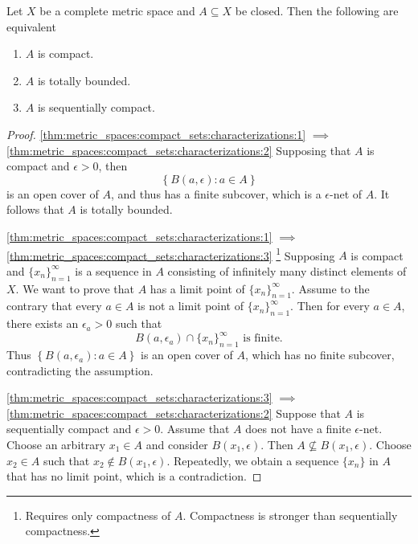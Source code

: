 \begin{thm}
\label{thm:metric_spaces:compact_sets:characterizations}
Let $X$ be a complete metric space and $A \subseteq X$ be closed. 
Then the following are equivalent 
\begin{enumerate}
    \item \label{thm:metric_spaces:compact_sets:characterizations:1}
    $A$ is compact. 
    \item \label{thm:metric_spaces:compact_sets:characterizations:2}
    $A$ is totally bounded. 
    \item \label{thm:metric_spaces:compact_sets:characterizations:3}
    $A$ is sequentially compact. 
\end{enumerate}
\end{thm}
\begin{proof}
\ref{thm:metric_spaces:compact_sets:characterizations:1} $\implies$ 
\ref{thm:metric_spaces:compact_sets:characterizations:2}
Supposing that $A$ is compact and $\epsilon > 0$, then 
\begin{equation*}
    \left\{ B(a, \epsilon): a \in A\right\}
\end{equation*}
is an open cover of $A$, and thus has a finite subcover, which is a 
$\epsilon$-net of $A$. 
It follows that $A$ is totally bounded. 

\ref{thm:metric_spaces:compact_sets:characterizations:1} $\implies$
\ref{thm:metric_spaces:compact_sets:characterizations:3}
\footnote{Requires only compactness of $A$. Compactness is stronger than 
sequentially compactness.}
Supposing $A$ is compact and $\{x_n\}_{n=1}^\infty$ is a sequence in $A$ 
consisting of infinitely many distinct elements of $X$. 
We want to prove that $A$ has a limit point of $\{x_n\}_{n=1}^\infty$. 
Assume to the contrary that every $a \in A$ is not a limit point of 
$\{x_n\}_{n=1}^\infty$. 
Then for every $a \in A$, there exists an $\epsilon_a > 0$ such that 
\begin{equation*}
    B(a, \epsilon_a) \cap \{x_n\}_{n=1}^\infty \text{ is finite}. 
\end{equation*}
Thus $\left\{ B(a, \epsilon_a): a \in A \right\}$ is an open cover of $A$, 
which has no finite subcover, contradicting the assumption. 

\ref{thm:metric_spaces:compact_sets:characterizations:3} $\implies$ 
\ref{thm:metric_spaces:compact_sets:characterizations:2}
Suppose that $A$ is sequentially compact and $\epsilon > 0$. 
Assume that $A$ does not have a finite $\epsilon$-net. 
Choose an arbitrary $x_1 \in A$ and consider $B(x_1, \epsilon)$. 
Then $A \not \subseteq B(x_1, \epsilon)$. 
Choose $x_2 \in A$ such that $x_2 \notin B(x_1, \epsilon)$. 
Repeatedly, we obtain a sequence $\{x_n\}$ in $A$ that has no limit point, 
which is a contradiction. 


\end{proof}
